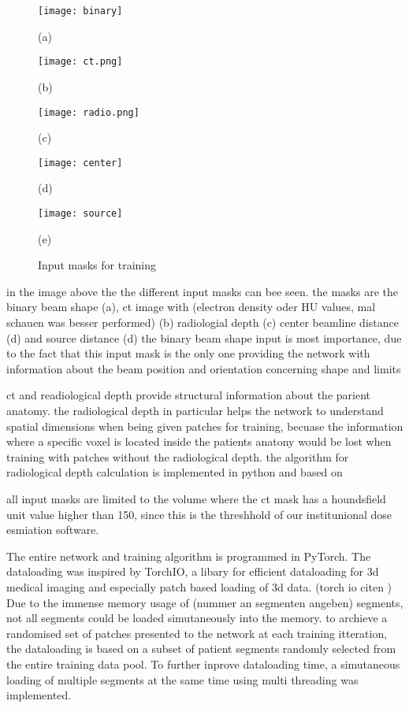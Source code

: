 \begin{figure}[H]
    \vspace{1cm}
        \texttt{[image: binary]}
        \caption*{(a)}
    \endminipage\hfill
        \captionsetup{format=hang}
        \texttt{[image: ct.png]}
        \caption*{(b)}
    \endminipage\hfill
        \texttt{[image: radio.png]}
        \caption*{(c)}
    \endminipage
    \vspace{1cm}
        \centering
        \texttt{[image: center]}
        \caption*{(d)}
    \endminipage\hfill
        \centering
        \texttt{[image: source]}
        \caption*{(e)}
    \endminipage\hfill
    \caption{Input masks for training}\label{fig: masks}
\end{figure}

in the image above the the different input masks can bee seen. the masks are the binary beam shape (a), ct image with (electron density oder HU values, mal schauen was besser performed) (b) radiologial depth (c) center beamline distance (d) and source distance (d) 
the binary beam shape input is most importance, due to the fact that this input mask is the only one providing the network with information about the beam position and orientation concerning shape and limits

ct and readiological depth provide structural information about the parient anatomy. the radiological depth in particular helps the network to understand spatial dimensions when being given patches for training, becuase the information where a specific voxel is located inside the patients anatony would be lost when training with patches without the radiological depth. the algorithm for radiological depth calculation is implemented in python and based on  \cite{siddon_fast_1985}

all input masks are limited to the volume where the ct mask has a houndsfield unit value higher than 150, since this is the threshhold of our institunional dose esmiation software.

The entire network and training algorithm is programmed in PyTorch. The dataloading was inspired by TorchIO, a libary for efficient dataloading for 3d medical imaging and especially patch based loading of 3d data. (torch io citen \cite{perez-garcia_torchio_2021}) Due to the immense memory usage of (nummer an segmenten angeben) segments, not all segments could be loaded simutaneously into the memory. to archieve a randomised set of patches presented to the network at each training itteration, the dataloading is based on a subset of patient segments randomly selected from the entire training data pool. To further inprove dataloading time, a simutaneous loading of multiple segments at the same time using multi threading was implemented. 

